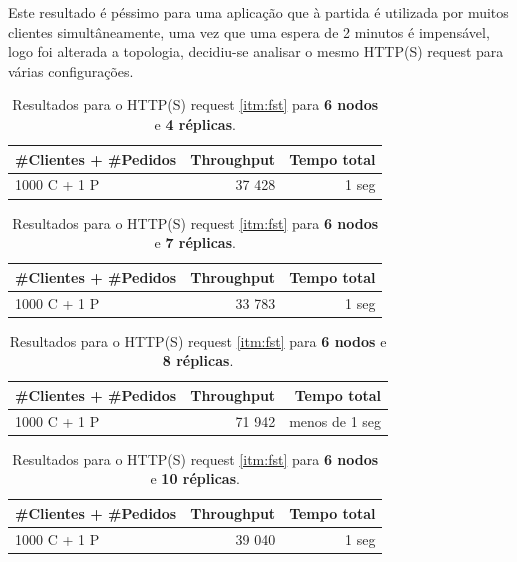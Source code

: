 Este resultado é péssimo para uma aplicação que à partida é utilizada por muitos clientes simultâneamente, uma vez que uma espera de 2 minutos é impensável, logo foi alterada a topologia, decidiu-se analisar o mesmo HTTP(S) request para várias configurações.

\begin{table}[H]
    \centering
    \begin{tabular}{|l||r||r|}
    \hline
        \#Clientes + \#Pedidos & Throughput & Tempo total \\ \hline \hline
        1000 C + 1 P & 37 428 & 1 seg \\ \hline
    \end{tabular}
    \caption{Resultados para o HTTP(S) request \ref{itm:fst} para \textbf{6 nodos} e \textbf{4 réplicas}.}
    \label{tab:testeFront}
\end{table}

\begin{table}[H]
    \centering
    \begin{tabular}{|l||r||r|}
    \hline
        \#Clientes + \#Pedidos & Throughput & Tempo total \\ \hline \hline
        1000 C + 1 P & 33 783 & 1 seg \\ \hline
    \end{tabular}
    \caption{Resultados para o HTTP(S) request \ref{itm:fst} para \textbf{6 nodos} e \textbf{7 réplicas}.}
    \label{tab:testeFront}
\end{table}

\begin{table}[H]
    \centering
    \begin{tabular}{|l||r||r|}
    \hline
        \#Clientes + \#Pedidos & Throughput & Tempo total \\ \hline \hline
        1000 C + 1 P & 71 942 & menos de 1 seg \\ \hline
    \end{tabular}
    \caption{Resultados para o HTTP(S) request \ref{itm:fst} para \textbf{6 nodos} e \textbf{8 réplicas}.}
    \label{tab:testeFront}
\end{table}

\begin{table}[H]
    \centering
    \begin{tabular}{|l||r||r|}
    \hline
        \#Clientes + \#Pedidos & Throughput & Tempo total \\ \hline \hline
        1000 C + 1 P & 39 040 & 1 seg \\ \hline
    \end{tabular}
    \caption{Resultados para o HTTP(S) request \ref{itm:fst} para \textbf{6 nodos} e \textbf{10 réplicas}.}
    \label{tab:testeFront}
\end{table}

